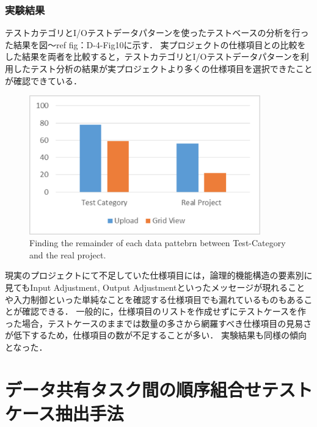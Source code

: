 \documentclass[10pt,a4j]{jarticle}
\begin{document}
\subsubsection{実験結果} \label{sec:4-2-3}
テストカテゴリとI/Oテストデータパターンを使ったテストベースの分析を行った結果を図〜ref {fig：D-4-Fig10}に示す．
実プロジェクトの仕様項目との比較をした結果を両者を比較すると，テストカテゴリとI/Oテストデータパターンを利用したテスト分析の結果が実プロジェクトより多くの仕様項目を選択できたことが確認できている．
   \begin{figure}[htbp]
  \begin{center}
  \includegraphics[width=10cm]{./image/D-4-Fig10.png}
  \caption{Finding the remainder of each data pattebrn between Test-Category and the real project.}
  \label{fig:D-4-Fig10}
  \end{center}
   \end{figure}


現実のプロジェクトにて不足していた仕様項目には，論理的機能構造の要素別に見てもInput Adjustment, Output Adjustmentといったメッセージが現れることや入力制御といった単純なことを確認する仕様項目でも漏れているものもあることが確認できる．
一般的に，仕様項目のリストを作成せずにテストケースを作った場合，テストケースのままでは数量の多さから網羅すべき仕様項目の見易さが低下するため，仕様項目の数が不足することが多い．
実験結果も同様の傾向となった．

\section{データ共有タスク間の順序組合せテストケース抽出手法} \label{chap:5}
\end{document}
